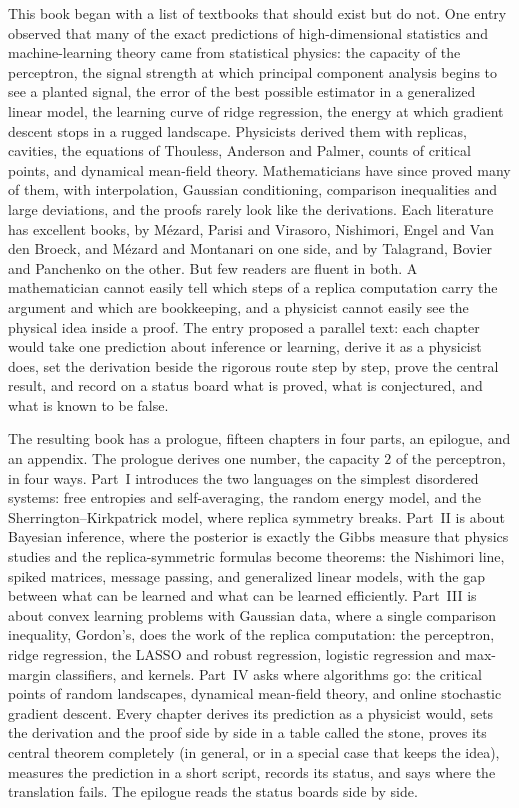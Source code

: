 
This book began with a list of textbooks that should exist but do not. One entry observed that many of the exact predictions of high-dimensional statistics and machine-learning theory came from statistical physics: the capacity of the perceptron, the signal strength at which principal component analysis begins to see a planted signal, the error of the best possible estimator in a generalized linear model, the learning curve of ridge regression, the energy at which gradient descent stops in a rugged landscape. Physicists derived them with replicas, cavities, the equations of Thouless, Anderson and Palmer, counts of critical points, and dynamical mean-field theory. Mathematicians have since proved many of them, with interpolation, Gaussian conditioning, comparison inequalities and large deviations, and the proofs rarely look like the derivations. Each literature has excellent books, by Mézard, Parisi and Virasoro, Nishimori, Engel and Van den Broeck, and Mézard and Montanari on one side, and by Talagrand, Bovier and Panchenko on the other. But few readers are fluent in both. A mathematician cannot easily tell which steps of a replica computation carry the argument and which are bookkeeping, and a physicist cannot easily see the physical idea inside a proof. The entry proposed a parallel text: each chapter would take one prediction about inference or learning, derive it as a physicist does, set the derivation beside the rigorous route step by step, prove the central result, and record on a status board what is proved, what is conjectured, and what is known to be false.

The resulting book has a prologue, fifteen chapters in four parts, an epilogue, and an appendix. The prologue derives one number, the capacity $2$ of the perceptron, in four ways. Part~I introduces the two languages on the simplest disordered systems: free entropies and self-averaging, the random energy model, and the Sherrington--Kirkpatrick model, where replica symmetry breaks. Part~II is about Bayesian inference, where the posterior is exactly the Gibbs measure that physics studies and the replica-symmetric formulas become theorems: the Nishimori line, spiked matrices, message passing, and generalized linear models, with the gap between what can be learned and what can be learned efficiently. Part~III is about convex learning problems with Gaussian data, where a single comparison inequality, Gordon's, does the work of the replica computation: the perceptron, ridge regression, the LASSO and robust regression, logistic regression and max-margin classifiers, and kernels. Part~IV asks where algorithms go: the critical points of random landscapes, dynamical mean-field theory, and online stochastic gradient descent. Every chapter derives its prediction as a physicist would, sets the derivation and the proof side by side in a table called the stone, proves its central theorem completely (in general, or in a special case that keeps the idea), measures the prediction in a short script, records its status, and says where the translation fails. The epilogue reads the status boards side by side.

